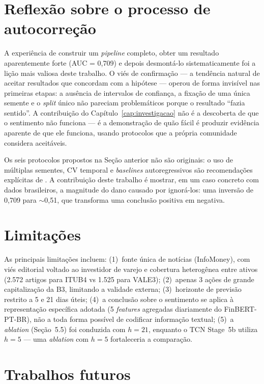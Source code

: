 \documentclass[
    12pt,
    openright,
    oneside,
    a4paper,
    english,
    brazil
]{abntex2}
\begin{document}
\section{Reflexão sobre o processo de autocorreção}

A experiência de construir um \textit{pipeline} completo, obter um resultado aparentemente forte (AUC = 0,709) e depois desmontá-lo sistematicamente foi a lição mais valiosa deste trabalho. O viés de confirmação --- a tendência natural de aceitar resultados que concordam com a hipótese --- operou de forma invisível nas primeiras etapas: a ausência de intervalos de confiança, a fixação de uma única semente e o \textit{split} único não pareciam problemáticos porque o resultado ``fazia sentido''. A contribuição do Capítulo~\ref{cap:investigacao} não é a descoberta de que o sentimento não funciona --- é a demonstração de quão fácil é produzir evidência aparente de que ele funciona, usando protocolos que a própria comunidade considera aceitáveis.

Os seis protocolos propostos na Seção anterior não são originais: o uso de múltiplas sementes, CV temporal e \textit{baselines} autoregressivos são recomendações explícitas de . A contribuição deste trabalho é mostrar, em um caso concreto com dados brasileiros, a magnitude do dano causado por ignorá-los: uma inversão de 0,709 para $\sim$0,51, que transforma uma conclusão positiva em negativa.

\section{Limitações}

As principais limitações incluem: (1)~fonte única de notícias (InfoMoney), com viés editorial voltado ao investidor de varejo e cobertura heterogênea entre ativos (2.572 artigos para ITUB4 vs 1.525 para VALE3); (2)~apenas 3 ações de grande capitalização da B3, limitando a validade externa; (3)~horizonte de previsão restrito a 5 e 21 dias úteis; (4)~a conclusão sobre o sentimento se aplica à representação específica adotada (5 \textit{features} agregadas diariamente do FinBERT-PT-BR), não a toda forma possível de codificar informação textual; (5)~a \textit{ablation} (Seção~5.5) foi conduzida com $h=21$, enquanto o TCN Stage~5b utiliza $h=5$ --- uma \textit{ablation} com $h=5$ fortaleceria a comparação.

\section{Trabalhos futuros}
\end{document}
